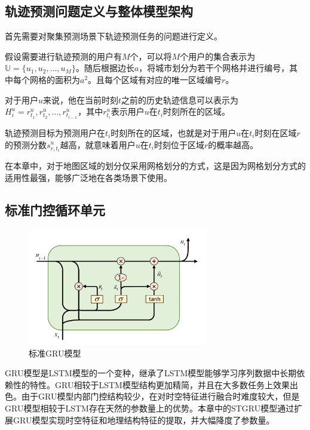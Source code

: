 \documentclass[master]{thesis-uestc}
\begin{document}
\subsection{轨迹预测问题定义与整体模型架构}

首先需要对聚集预测场景下轨迹预测任务的问题进行定义。

假设需要进行轨迹预测的用户有$M$个，可以将$M$个用户的集合表示为$\mathbb{U}= \{u_1,u_2,\dots, u_M\}$。随后根据边长$a$，将城市划分为若干个网格并进行编号，其中每个网格的面积为$a^2$。且每个区域有对应的唯一区域编号$r$。

对于用户$u$来说，他在当前时刻$t$之前的历史轨迹信息可以表示为$H_i^u = {r_{t_1}^u, r_{t_2}^u, \dots, r_{t_{i-1}}^u}$，其中$r_{t_i}^u$表示用户$u$在$t_i$时刻所在的区域。

轨迹预测目标为预测用户在$t_i$时刻所在的区域，也就是对于用户$u$在$t_i$时刻在区域$r$的预测分数$s^u_{r,t_i}$越高，就意味着用户$u$在$t_i$时刻位于区域$r$的概率越高。

在本章中，对于地图区域的划分仅采用网格划分的方式，这是因为网格划分方式的适用性最强，能够广泛地在各类场景下使用。

\subsection{标准门控循环单元}

\begin{figure}[!ht]
\centering 
\includegraphics[width=0.7\textwidth]{./pic/gru.pdf}
\caption{标准GRU模型}
\label{Figure.3.2}
\end{figure}

GRU模型是LSTM模型的一个变种，继承了LSTM模型能够学习序列数据中长期依赖性的特性。GRU相较于LSTM模型结构更加精简，并且在大多数任务上效果出色。由于GRU模型内部门控结构较少，在对时空特征进行融合时难度较大，但是GRU模型相较于LSTM存在天然的参数量上的优势。本章中的STGRU模型通过扩展GRU模型实现时空特征和地理结构特征的提取，并大幅降度了参数量。
\end{document}
